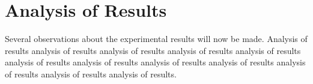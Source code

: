 \section{Analysis of Results}

Several observations about the experimental results will now be made.
Analysis of results analysis of results analysis of results
analysis of results analysis of results analysis of results
analysis of results analysis of results analysis of results
analysis of results analysis of results analysis of results.
